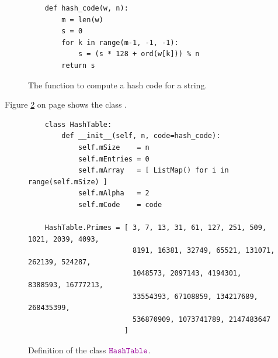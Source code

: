 \begin{figure}[!ht]
\centering
\begin{verbatim}
    def hash_code(w, n):
        m = len(w)
        s = 0
        for k in range(m-1, -1, -1):
            s = (s * 128 + ord(w[k])) % n
        return s
\end{verbatim}
\vspace*{-0.3cm}
\caption{The function  to compute a hash code for a string.}
\label{fig:hash_code.py}
\end{figure}


\noindent
Figure \ref{fig:HashMap.ipynb} on page \pageref{fig:HashMap.ipynb} shows the class .

\begin{figure}[!ht]
  \centering
\begin{verbatim}
    class HashTable:
        def __init__(self, n, code=hash_code):
            self.mSize    = n
            self.mEntries = 0                                        
            self.mArray   = [ ListMap() for i in range(self.mSize) ] 
            self.mAlpha   = 2                                        
            self.mCode    = code

    HashTable.Primes = [ 3, 7, 13, 31, 61, 127, 251, 509, 1021, 2039, 4093, 
                         8191, 16381, 32749, 65521, 131071, 262139, 524287, 
                         1048573, 2097143, 4194301, 8388593, 16777213, 
                         33554393, 67108859, 134217689, 268435399, 
                         536870909, 1073741789, 2147483647 
                       ]        
\end{verbatim}
\vspace*{-0.3cm}
  \caption{Definition of the class $\mytt{HashTable}$.}
  \label{fig:HashMap.ipynb}
\end{figure}

